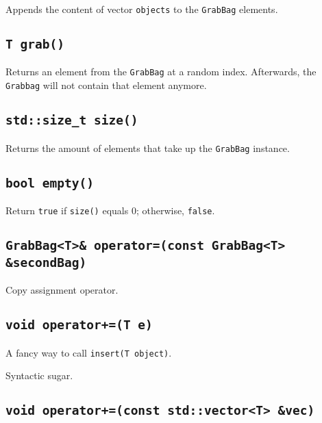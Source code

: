 \documentclass[a4paper,12pt]{article}
\begin{document}
Appends the content of vector \texttt{objects} to the \texttt{GrabBag} elements.

 

\subsection{\texttt{T grab()}}

Returns an element from the \texttt{GrabBag} at a random index. 
Afterwards, the \texttt{Grabbag} will not contain that element anymore.



\newpage

\subsection{\texttt{std::size\_t size()}}

Returns the amount of elements that take up the \texttt{GrabBag} instance.

\subsection{\texttt{bool empty()}}

Return \texttt{true} if \texttt{size()} equals 0; otherwise, \texttt{false}.



\subsection{\texttt{GrabBag<T>\& operator=(const GrabBag<T> \&secondBag)}}

Copy assignment operator.



\subsection{\texttt{void operator+=(T e)}}

A fancy way to call \texttt{insert(T object)}.

Syntactic sugar.

\subsection{\texttt{void operator+=(const std::vector<T> \&vec)}}
\end{document}
